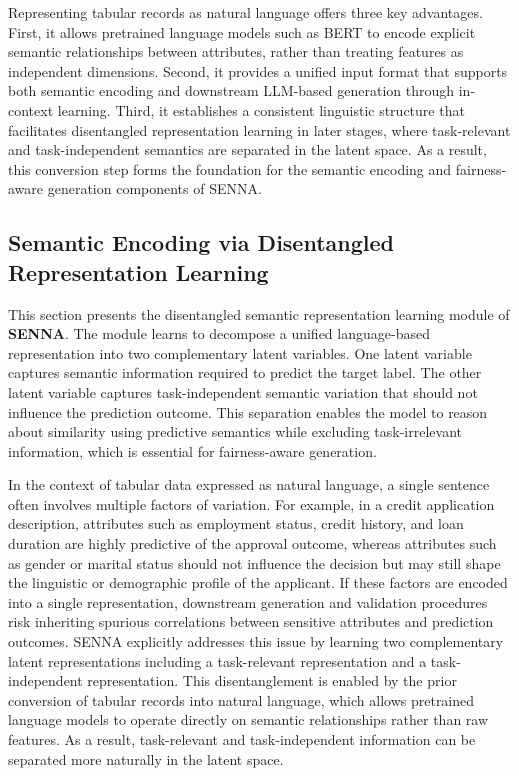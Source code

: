 \documentclass[runningheads]{llncs}
\begin{document}
Representing tabular records as natural language offers three key advantages.
First, it allows pretrained language models such as BERT to encode explicit semantic relationships
between attributes, rather than treating features as independent dimensions.
Second, it provides a unified input format that supports both semantic encoding and downstream
LLM-based generation through in-context learning.
Third, it establishes a consistent linguistic structure that facilitates disentangled representation
learning in later stages, where task-relevant and task-independent semantics are separated in the
latent space. As a result, this conversion step forms the foundation for the semantic encoding and fairness-aware
generation components of SENNA.

\subsection{Semantic Encoding via Disentangled Representation Learning}
This section presents the disentangled semantic representation learning module of \textbf{SENNA}. The module learns to decompose a unified language-based representation into two complementary latent variables. One latent variable captures semantic information required to predict the target label. The other latent variable captures task-independent semantic variation that should not influence the prediction outcome. This separation enables the model to reason about similarity using predictive semantics while excluding task-irrelevant information, which is essential for fairness-aware generation.

In the context of tabular data expressed as natural language, a single sentence often involves multiple factors of variation. For example, in a credit application description, attributes such as employment status, credit history, and loan duration are highly predictive of the approval outcome, whereas attributes such as gender or marital status should not influence the decision but may still shape the linguistic or demographic profile of the applicant. If these factors are encoded into a single representation, downstream generation and validation procedures risk inheriting spurious correlations between sensitive attributes and prediction outcomes. SENNA explicitly addresses this issue by learning two complementary latent representations including a task-relevant representation and a task-independent representation. This disentanglement is enabled by the prior conversion of tabular records into natural language, which allows pretrained language models to operate directly on semantic relationships rather than raw features.  As a result, task-relevant and task-independent information can be separated more naturally in the latent space.
\end{document}
